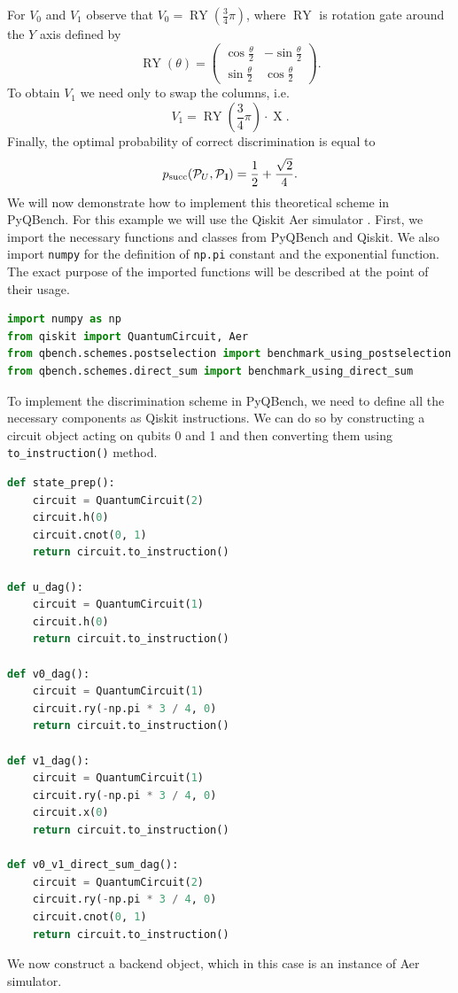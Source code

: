 \documentclass[preprint,12pt, a4paper, dvipsnames]{elsarticle}
\newcommand{\1}{{\rm 1\hspace{-0.9mm}l}}
\newcommand{\Id}{{\rm 1\hspace{-0.9mm}l}}
\newcommand{\PP}{\mathcal{P}}
\theoremstyle{definition}
\begin{document}
For $V_0$ and $V_1$ observe that $V_0 = \operatorname{RY}\left(\frac{3}{4} \pi \right) $, where $\operatorname{RY}$ is rotation gate around the $Y$ axis defined by
\begin{equation}
\operatorname{RY}(\theta) =
\left(\begin{array}{cc} \cos\frac{\theta}{2} & -\sin\frac{\theta}{2} \\ \sin\frac{\theta}{2} & \cos\frac{\theta}{2} \end{array}\right).
\end{equation}
To obtain $V_1$  we need only to swap the columns, i.e.
\begin{equation}
V_1 = \operatorname{RY}\left(\frac{3}{4} \pi \right) \cdot \operatorname{X}.
\end{equation}
Finally, the optimal probability of correct discrimination is equal to
\begin{equation}
p_{\text{succ}}(\PP_{U}, \PP_{\Id}) = \frac{1}{2} + \frac{\sqrt{2}}{4}.
\end{equation}
We will now demonstrate how to implement this theoretical scheme in PyQBench. For this example we
will use the Qiskit Aer simulator \cite{aer}. First, we import the necessary functions and classes from
PyQBench and Qiskit. We also import \texttt{numpy} for the definition of \texttt{np.pi} constant and
the exponential function. The exact purpose of the imported functions will be described at the point
of their usage.
\begin{lstlisting}[language=Python, caption=Imports needed for running benchmarking example]
import numpy as np
from qiskit import QuantumCircuit, Aer
from qbench.schemes.postselection import benchmark_using_postselection
from qbench.schemes.direct_sum import benchmark_using_direct_sum
\end{lstlisting}
To implement the discrimination scheme in PyQBench, we need to define all the necessary components
as Qiskit instructions. We can do so by constructing a circuit object acting on qubits 0 and 1 and
then converting them using \texttt{to\_instruction()} method.
\begin{lstlisting}[language=Python, caption= Defining components for Hadamard experiment]
def state_prep():
	circuit = QuantumCircuit(2)
	circuit.h(0)
	circuit.cnot(0, 1)
	return circuit.to_instruction()

def u_dag():
	circuit = QuantumCircuit(1)
	circuit.h(0)
	return circuit.to_instruction()

def v0_dag():
	circuit = QuantumCircuit(1)
	circuit.ry(-np.pi * 3 / 4, 0)
	return circuit.to_instruction()

def v1_dag():
	circuit = QuantumCircuit(1)
	circuit.ry(-np.pi * 3 / 4, 0)
	circuit.x(0)
	return circuit.to_instruction()

def v0_v1_direct_sum_dag():
	circuit = QuantumCircuit(2)
	circuit.ry(-np.pi * 3 / 4, 0)
	circuit.cnot(0, 1)
	return circuit.to_instruction()
\end{lstlisting}
We now construct a backend object, which in this case is an instance of Aer simulator.
\end{document}
